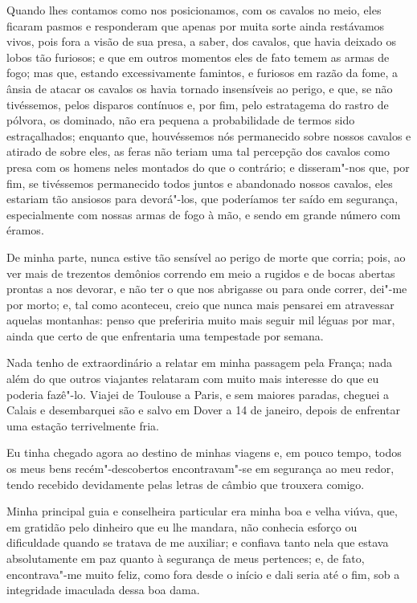 Quando lhes contamos como nos posicionamos, com os cavalos no meio, eles
ficaram pasmos e responderam que apenas por muita sorte ainda restávamos
vivos, pois fora a visão de sua presa, a saber, dos cavalos, que havia
deixado os lobos tão furiosos; e que em outros momentos eles de fato
temem as armas de fogo; mas que, estando excessivamente famintos, e
furiosos em razão da fome, a ânsia de atacar os cavalos os havia tornado
insensíveis ao perigo, e que, se não tivéssemos, pelos disparos
contínuos e, por fim, pelo estratagema do rastro de pólvora, os
dominado, não era pequena a probabilidade de termos sido estraçalhados;
enquanto que, houvéssemos nós permanecido sobre nossos cavalos e atirado
de sobre eles, as feras não teriam uma tal percepção dos cavalos como
presa com os homens neles montados do que o contrário; e disseram"-nos
que, por fim, se tivéssemos permanecido todos juntos e abandonado nossos
cavalos, eles estariam tão ansiosos para devorá"-los, que poderíamos ter
saído em segurança, especialmente com nossas armas de fogo à mão, e
sendo em grande número com éramos.

De minha parte, nunca estive tão sensível ao perigo de morte que corria;
pois, ao ver mais de trezentos demônios correndo em meio a rugidos e de
bocas abertas prontas a nos devorar, e não ter o que nos abrigasse ou
para onde correr, dei"-me por morto; e, tal como aconteceu, creio que
nunca mais pensarei em atravessar aquelas montanhas: penso que
preferiria muito mais seguir mil léguas por mar, ainda que certo de que
enfrentaria uma tempestade por semana.

Nada tenho de extraordinário a relatar em minha passagem pela França;
nada além do que outros viajantes relataram com muito mais interesse do
que eu poderia fazê"-lo. Viajei de Toulouse a Paris, e sem maiores
paradas, cheguei a Calais e desembarquei são e salvo em Dover a 14 de
janeiro, depois de enfrentar uma estação terrivelmente fria.

Eu tinha chegado agora ao destino de minhas viagens e, em pouco tempo,
todos os meus bens recém"-descobertos encontravam"-se em segurança ao meu
redor, tendo recebido devidamente pelas letras de câmbio que trouxera
comigo.

Minha principal guia e conselheira particular era minha boa e velha
viúva, que, em gratidão pelo dinheiro que eu lhe mandara, não conhecia
esforço ou dificuldade quando se tratava de me auxiliar; e confiava
tanto nela que estava absolutamente em paz quanto à segurança de meus
pertences; e, de fato, encontrava"-me muito feliz, como fora desde o
início e dali seria até o fim, sob a integridade imaculada dessa boa
dama.

